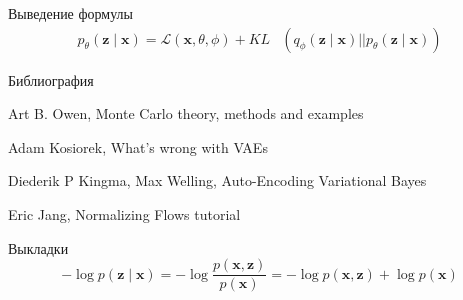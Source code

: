 \documentclass{beamer}
\begin{document}
    \begin{frame}{Выведение формулы}{}
        \begin{align*}
        p_\theta(\mathbf{z} \mid \mathbf{x}) = \mathcal{L}(\mathbf{x}, \theta, \phi) +  KL &\left(q_\phi(\mathbf{z} \mid \mathbf{x}) || p_\theta(\mathbf{z} \mid \mathbf{x})\right)
        \end{align*}
    \end{frame}
   
    \begin{frame}{Библиография}
        \begin{thebibliography}{9}
            Art B. Owen, Monte Carlo theory, methods and examples
            
            Adam Kosiorek, What's wrong with VAEs

            Diederik P Kingma, Max Welling, Auto-Encoding Variational Bayes

            Eric Jang, Normalizing Flows tutorial
            
        \end{thebibliography}
    \end{frame}

    \begin{frame}{Выкладки}{}
        $$-\log p(\mathbf{z} \mid \mathbf{x}) = -\log \frac{p(\mathbf{x}, \mathbf{z})}{p(\mathbf{x})} = -\log p(\mathbf{x}, \mathbf{z}) + \log p(\mathbf{x})$$
    \end{frame}
    
\end{document}

